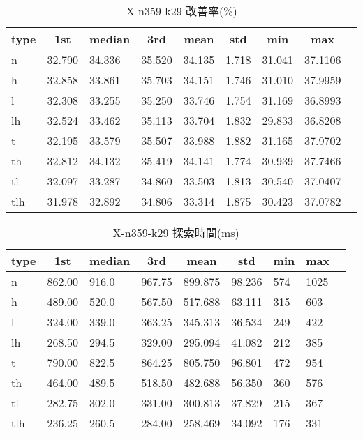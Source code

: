 \begin{table}[htbp]
    \caption{X-n359-k29 改善率(\%)}
    \begin{tabular}{|l|l|l|l|l|l|l|l|l|}\hline
    \multicolumn{1}{|c|}{\textbf{type}}
    &\multicolumn{1}{|c|}{\textbf{1st}}
    &\multicolumn{1}{c|}{\textbf{median}}
    &\multicolumn{1}{c|}{\textbf{3rd}}
    &\multicolumn{1}{c|}{\textbf{mean}}
    &\multicolumn{1}{c|}{\textbf{std}}
    &\multicolumn{1}{c|}{\textbf{min}}
    &\multicolumn{1}{c|}{\textbf{max}}\\\hline
	n & 32.790 & 34.336 & 35.520 & 34.135 & 1.718 & 31.041 & 37.1106\\\hline
	h & 32.858 & 33.861 & 35.703 & 34.151 & 1.746 & 31.010 & 37.9959\\\hline
	l & 32.308 & 33.255 & 35.250 & 33.746 & 1.754 & 31.169 & 36.8993\\\hline
	lh & 32.524 & 33.462 & 35.113 & 33.704 & 1.832 & 29.833 & 36.8208\\\hline
	t & 32.195 & 33.579 & 35.507 & 33.988 & 1.882 & 31.165 & 37.9702\\\hline
	th & 32.812 & 34.132 & 35.419 & 34.141 & 1.774 & 30.939 & 37.7466\\\hline
	tl & 32.097 & 33.287 & 34.860 & 33.503 & 1.813 & 30.540 & 37.0407\\\hline
	tlh & 31.978 & 32.892 & 34.806 & 33.314 & 1.875 & 30.423 & 37.0782\\\hline
	\end{tabular}
\end{table}
\begin{table}[htbp]
    \caption{X-n359-k29 探索時間(ms)}
    \begin{tabular}{|l|l|l|l|l|l|l|l|l|}\hline
    \multicolumn{1}{|c|}{\textbf{type}}
    &\multicolumn{1}{|c|}{\textbf{1st}}
    &\multicolumn{1}{c|}{\textbf{median}}
    &\multicolumn{1}{c|}{\textbf{3rd}}
    &\multicolumn{1}{c|}{\textbf{mean}}
    &\multicolumn{1}{c|}{\textbf{std}}
    &\multicolumn{1}{c|}{\textbf{min}}
    &\multicolumn{1}{c|}{\textbf{max}}\\\hline
	n & 862.00 & 916.0 & 967.75 & 899.875 & 98.236 & 574 & 1025\\\hline
	h & 489.00 & 520.0 & 567.50 & 517.688 & 63.111 & 315 & 603\\\hline
	l & 324.00 & 339.0 & 363.25 & 345.313 & 36.534 & 249 & 422\\\hline
	lh & 268.50 & 294.5 & 329.00 & 295.094 & 41.082 & 212 & 385\\\hline
	t & 790.00 & 822.5 & 864.25 & 805.750 & 96.801 & 472 & 954\\\hline
	th & 464.00 & 489.5 & 518.50 & 482.688 & 56.350 & 360 & 576\\\hline
	tl & 282.75 & 302.0 & 331.00 & 300.813 & 37.829 & 215 & 367\\\hline
	tlh & 236.25 & 260.5 & 284.00 & 258.469 & 34.092 & 176 & 331\\\hline
	\end{tabular}
\end{table}
